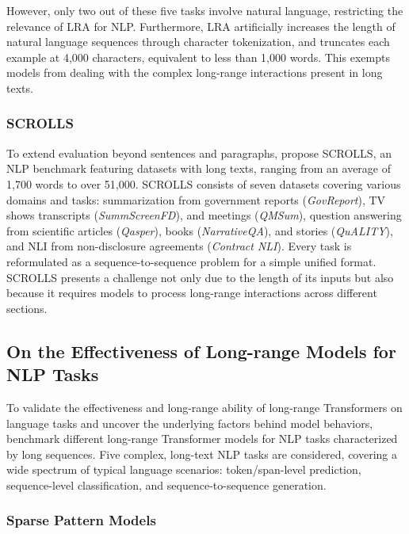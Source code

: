 However, only two out of these five tasks involve natural language, restricting the relevance of \ac{LRA} for \ac{NLP}. Furthermore, \ac{LRA} artificially increases the length of natural language sequences through character tokenization, and truncates each example at 4,000 characters, equivalent to less than 1,000 words. This exempts models from dealing with the complex long-range interactions present in long texts.

\subsubsection{SCROLLS} To extend evaluation beyond sentences and paragraphs, \citet{shaham2022scrolls} propose \ac{SCROLLS}, an \ac{NLP} benchmark featuring datasets with long texts, ranging from an average of 1,700 words to over 51,000. \ac{SCROLLS} consists of seven datasets covering various domains and tasks: summarization from government reports (\textit{GovReport}), TV shows transcripts (\textit{SummScreenFD}), and meetings (\textit{QMSum}), question answering from scientific articles (\textit{Qasper}), books (\textit{NarrativeQA}), and stories (\textit{QuALITY}), and \ac{NLI} from non-disclosure agreements (\textit{Contract NLI}). Every task is reformulated as a sequence-to-sequence problem for a simple unified format. \ac{SCROLLS} presents a challenge not only due to the length of its inputs but also because it requires models to process long-range interactions across different sections. 

\subsection{On the Effectiveness of Long-range Models for NLP Tasks}

To validate the effectiveness and long-range ability of long-range Transformers on language tasks and uncover the underlying factors behind model behaviors, \citet{qin2022nlp} benchmark different long-range Transformer models for \ac{NLP} tasks characterized by long sequences. Five complex, long-text \ac{NLP} tasks are considered, covering a wide spectrum of typical language scenarios: token/span-level prediction, sequence-level classification, and sequence-to-sequence generation.

\subsubsection{Sparse Pattern Models}

